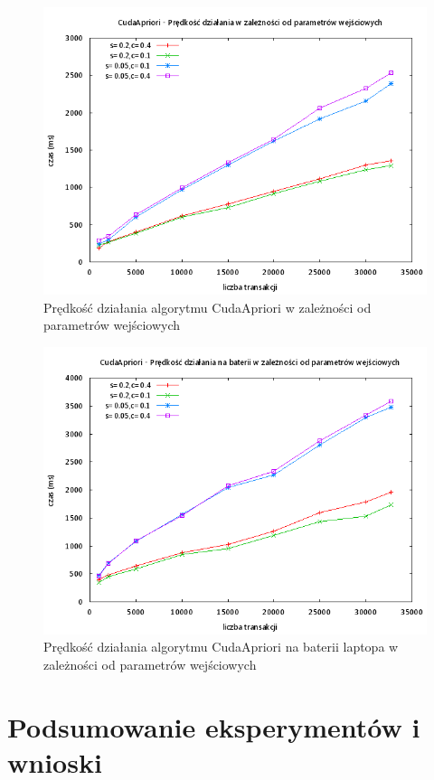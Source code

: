 \begin{figure}[ht]
\centering
\includegraphics[width=1.1\textwidth]{figures/06/capriori.png}
\caption{Prędkość działania algorytmu CudaApriori w zależności od parametrów wejściowych}
\end{figure}

\begin{figure}[ht]
\centering
\includegraphics[width=1.1\textwidth]{figures/06/capriori_bat.png}
\caption{Prędkość działania algorytmu CudaApriori na baterii laptopa w zależności od parametrów wejściowych}
\end{figure}

\section{Podsumowanie eksperymentów i wnioski}